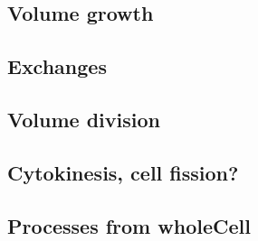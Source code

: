 \subsection{Volume growth}


\subsection{Exchanges}


\subsection{Volume division}


\subsection{Cytokinesis, cell fission?}


\subsection{Processes from wholeCell}

